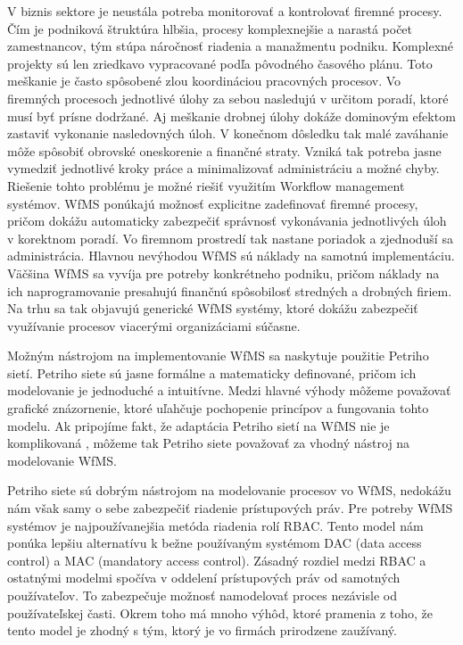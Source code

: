 
V biznis sektore je neustála potreba monitorovať a kontrolovať firemné procesy. Čím je podniková štruktúra hlbšia, procesy komplexnejšie a narastá počet zamestnancov, tým stúpa náročnosť riadenia a manažmentu podniku. Komplexné projekty sú len zriedkavo vypracované podľa pôvodného časového plánu. Toto meškanie je často spôsobené zlou koordináciou pracovných procesov. Vo firemných  procesoch jednotlivé úlohy za sebou nasledujú v určitom poradí, ktoré musí byť prísne dodržané. Aj meškanie drobnej úlohy dokáže dominovým efektom zastaviť vykonanie nasledovných úloh. V konečnom dôsledku tak malé zaváhanie môže spôsobiť obrovské oneskorenie a finančné straty.   Vzniká tak potreba jasne vymedziť jednotlivé kroky práce a minimalizovať administráciu a možné chyby. Riešenie tohto problému je možné riešiť využitím Workflow management systémov.  WfMS ponúkajú možnosť explicitne zadefinovať firemné procesy, pričom dokážu automaticky zabezpečiť správnosť vykonávania jednotlivých úloh v korektnom poradí. Vo firemnom prostredí tak nastane poriadok a zjednoduší sa administrácia. Hlavnou nevýhodou WfMS sú náklady na samotnú implementáciu. Väčšina WfMS sa vyvíja pre potreby konkrétneho podniku, pričom náklady na ich naprogramovanie presahujú finančnú spôsobilosť stredných a drobných firiem. Na trhu sa tak objavujú generické WfMS systémy, ktoré dokážu zabezpečiť využívanie procesov viacerými organizáciami súčasne. 

Možným nástrojom na implementovanie WfMS sa naskytuje použitie Petriho sietí. Petriho siete sú jasne formálne a matematicky definované, pričom ich modelovanie je jednoduché a intuitívne. Medzi hlavné výhody môžeme považovať grafické znázornenie, ktoré uľahčuje pochopenie princípov a fungovania tohto modelu. Ak pripojíme fakt, že adaptácia Petriho sietí na WfMS nie je komplikovaná , môžeme tak Petriho siete považovať za vhodný nástroj na modelovanie WfMS. 

Petriho siete sú dobrým nástrojom na modelovanie procesov vo WfMS, nedokážu nám však samy o sebe zabezpečiť riadenie prístupových práv. Pre potreby WfMS systémov je najpoužívanejšia metóda riadenia rolí RBAC. Tento model nám ponúka lepšiu alternatívu k bežne používaným systémom DAC (data access control) a MAC (mandatory access control). Zásadný rozdiel medzi RBAC a ostatnými modelmi spočíva v oddelení prístupových práv od samotných používateľov. To zabezpečuje možnosť namodelovať proces nezávisle od používateľskej časti. Okrem toho má mnoho výhôd, ktoré pramenia z toho, že tento model je zhodný s tým, ktorý je vo firmách prirodzene zaužívaný.



